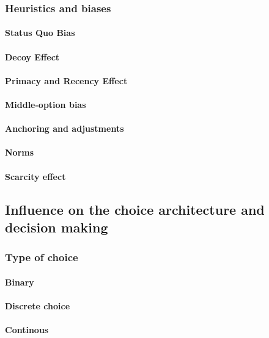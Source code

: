 \subsubsection{Heuristics and biases}
\paragraph{Status Quo Bias}
\paragraph{Decoy Effect}
\paragraph{Primacy and Recency Effect}
\paragraph{Middle-option bias}
\paragraph{Anchoring and adjustments}
\paragraph{Norms}
\paragraph{Scarcity effect}


\subsection{Influence on the choice architecture and decision making}

\subsubsection{Type of choice}
\paragraph{Binary}
\paragraph{Discrete choice}
\paragraph{Continous}
